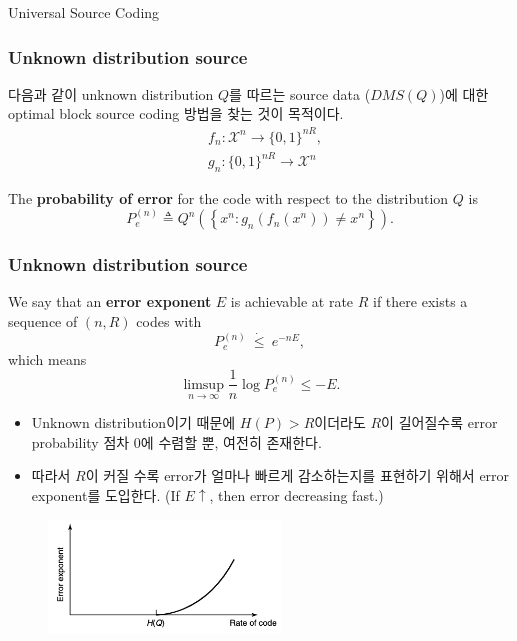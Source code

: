 \documentclass[9pt]{beamer}
\begin{document}
    \begin{section}{Universal Source Coding}
        \begin{frame}
            \frametitle{Unknown distribution source}
            다음과 같이 \alert{unknown} distribution $Q$를 따르는 source data ($DMS(Q)$)에 대한 optimal block source coding 방법을 찾는 것이 목적이다.
            $$ \begin{aligned} &f_n: \mathcal{X}^n \rightarrow\{0,1\}^{n R}, \\ &g_n:\{0,1\}^{n R} \rightarrow \mathcal{X}^n \end{aligned}$$

            \begin{definition}
                The \textbf{probability of error} for the code with respect to the distribution $Q$ is
                $$ P_e^{(n)} \triangleq Q^n\left(\left\{x^n: g_n\left(f_n\left(x^n\right)\right) \neq x^n\right\}\right) .$$
            \end{definition}
            
            
        \end{frame}

        \begin{frame}
            \frametitle{Unknown distribution source}
            
            \begin{definition}
                We say that an \textbf{error exponent} $E$ is achievable at rate $R$ if there exists a sequence of $(n, R)$ codes with 
                $$P_e^{(n)}\  \dot {\le}\  e^{-nE},$$
                which means 
                $$\limsup_{ n \rightarrow \infty} \frac{1}{n} \log P_e^{(n)} \le -E.$$
            \end{definition}

            \begin{itemize}
                \item Unknown distribution이기 때문에 $H(P) > R$이더라도 $R$이 길어질수록 error probability 점차 0에 수렴할 뿐, 여전히 존재한다.
                \item 따라서 $R$이 커질 수록 error가 얼마나 빠르게 감소하는지를 표현하기 위해서 error exponent를 도입한다. (If $E \uparrow$, then error decreasing fast.)
            \end{itemize}

            \begin{figure}
                \includegraphics[width=0.55\textwidth]{image/L4_error_exponent.png}
            \end{figure}
        \end{frame}
        

\end{section}
\end{document}
